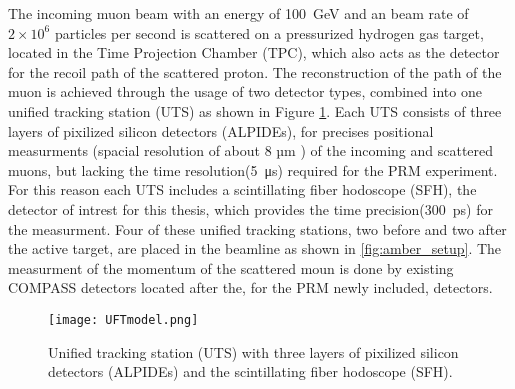 The incoming muon beam with an energy of \SI{100} {\giga\electronvolt}\autocite{ProposalAmber} and an beam rate of $2 \times 10^6$\autocite{ConfrancePaperDAQ} particles per second is scattered on a pressurized hydrogen gas target, located in the Time Projection Chamber (TPC), 
which also acts as the detector for the recoil path of the scattered proton.
\newline
The reconstruction of the path of the muon is achieved through the usage of two detector types,
 combined into one unified tracking station (UTS) as shown in Figure \ref{UTSpicture}.
\newline
Each UTS consists of three layers of pixilized silicon detectors (ALPIDEs), for precises positional measurments (spacial resolution of about 8 µm \autocite{Amber2022Status}) of the incoming and scattered muons, 
but lacking the time resolution(\SI{5} {\micro\second}\autocite{Amber2022Status}) required for the PRM experiment.
For this reason each UTS includes a scintillating fiber hodoscope (SFH), the detector of intrest for this thesis,
 which provides the time precision(\SI{300} {\pico\second}\Autocite{Amber2022Status}) for the measurment.
 \newline
Four of these unified tracking stations, two before and two after the active target, are placed in the beamline as shown in \ref{fig:amber_setup}.
The measurment of the momentum of the scattered moun is done by existing COMPASS detectors located after the, 
for the PRM newly included, detectors\autocite{ProposalAmber}.

\begin{figure}[H]	
	\centering
	\texttt{[image: UFTmodel.png]}
	\caption{Unified tracking station (UTS) with three layers of pixilized silicon detectors (ALPIDEs) and the scintillating fiber hodoscope (SFH). \autocite{InternalcommunicationKarl}}
	\label{UTSpicture}
\end{figure}
